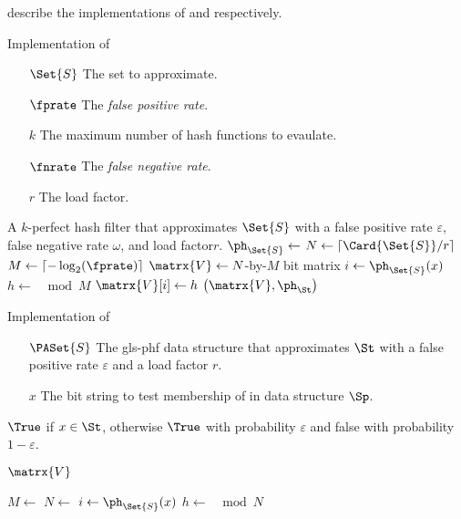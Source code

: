  describe the implementations of \MakeApproxSet and \Contains respectively.
\begin{algorithm}[h]
    \caption{Implementation of \protect\MakeKPerfectHashSet}
    \label{alg:PHF}
    \KwIn
    {
        \begin{itemize}
            \item[$\Set{S}$] The set to approximate.
            \item[$\fprate$] The \emph{false positive rate}.
            \item[$k$] The maximum number of hash functions to evaulate.
            \item[$\fnrate$] The \emph{false negative rate}.
            \item[$r$] The load factor.
        \end{itemize}
    }
    \KwOut
    {
        A $k$-perfect hash filter that approximates $\Set{S}$ with a false positive rate $\varepsilon$, false negative rate $\omega$, and load factor$r$.
    }
    {
        $\ph_{\Set{S}} \gets$ \;
        $N \gets \left\lceil \Card{\Set{S}} / r \right\rceil$\;
        $M \gets \left\lceil -\log_2\!\left(\fprate\right) \right\rceil$\;
        $\matrx{V} \gets N$-by-$M$ bit matrix\;
        {
            $i \gets \ph_{\Set{S}}\!\left(x\right)$\;
            $h \gets$ $\mod M$\;
            $\matrx{V}\!\left[i\right] \gets h$\;
        }
        \Return $\left(\matrx{V}, \ph_{\St}\right)$\;
    }
\end{algorithm}
\begin{algorithm}[h]
    \caption{Implementation of \protect\Contains}
    \label{alg:PHF_has}
    \KwIn
    {
        \begin{enumerate}
            \item[$\PASet{S}$] The \gls{gls-phf} data structure that approximates $\St$ with a false positive rate $\varepsilon$ and a load factor $r$.
            \item[$x$] The bit string to test membership of in data structure $\Sp$.
        \end{enumerate}
    }
    \KwOut
    {
        $\True$ if $x \in \St$, otherwise $\True$ with probability $\varepsilon$ and false with probability $1 - \varepsilon$.
    }
    {
        $\matrx{V}$

        $M \gets$ \;
        $N \gets$ \;
        $i \gets \ph_{\Set{S}}\!\left(x\right)$\;
        $h \gets$ $ \mod N$\;
        \;
    }
\end{algorithm}
